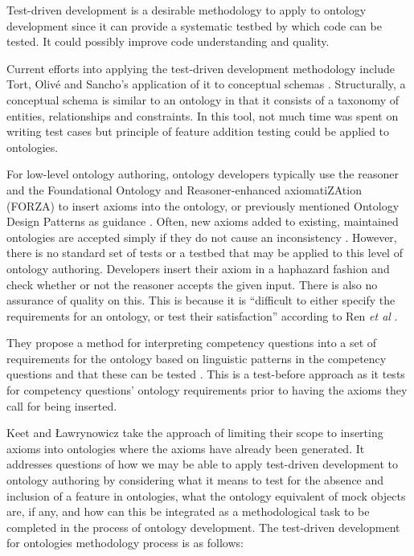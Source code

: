 \documentclass[draft]{sig-alternate-05-2015}
\begin{document}
Test-driven development is a desirable methodology to apply to ontology development since it can provide a systematic testbed by which code can be tested. It could possibly improve code understanding and quality.

Current efforts into applying the test-driven development methodology include Tort, Oliv\'{e} and Sancho's application of it to conceptual schemas \cite{DBLP:journals/dke/TortOS11}. Structurally, a conceptual schema is similar to an ontology in that it consists of a taxonomy of entities, relationships and constraints. In this tool, not much time was spent on writing test cases but principle of feature addition testing could be applied to ontologies.

For low-level ontology authoring, ontology developers typically use the reasoner and the Foundational Ontology and Reasoner-enhanced axiomatiZAtion (FORZA) to insert axioms into the ontology, or previously mentioned Ontology Design Patterns as guidance \cite{DBLP:conf/esws/KeetL16}. Often, new axioms added to existing, maintained ontologies are accepted simply if they do not cause an inconsistency \cite{DBLP:journals/ws/NikitinaRG12}. However, there is no standard set of tests or a testbed that may be applied to this level of ontology authoring. Developers insert their axiom in a haphazard fashion and check whether or not the reasoner accepts the given input. There is also no assurance of quality on this. This is because it is ``difficult to either specify the requirements for an ontology, or test their satisfaction'' according to Ren \textit{et al} \cite{DBLP:conf/esws/RenPMPDS14}.

They propose a method for interpreting competency questions into a set of requirements for the ontology based on linguistic patterns in the competency questions and that these can be tested \cite{DBLP:conf/esws/RenPMPDS14}. This is a test-before approach as it tests for competency questions' ontology requirements prior to having the axioms they call for being inserted. 

Keet and \L{}awrynowicz \cite{DBLP:conf/esws/KeetL16} take the approach of limiting their scope to inserting axioms into ontologies where the axioms have already been generated. It addresses questions of how we may be able to apply test-driven development to ontology authoring by considering what it means to test for the absence and inclusion of a feature in ontologies, what the ontology equivalent of mock objects are, if any, and how can this be integrated as a methodological task to be completed in the process of ontology development. The test-driven development for ontologies methodology process is as follows:
\end{document}
